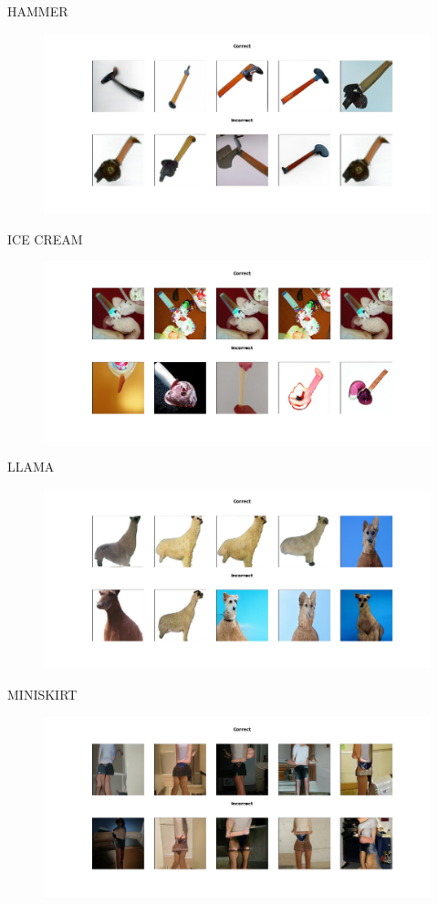 \documentclass[12pt,a4paper,openany]{book}
\begin{document}
\newline
HAMMER
\begin{figure}[ht!]
    \centering
    \includegraphics[scale=0.4]{figs/imagenet_examples/hammer.png}
\end{figure}
\newpage
\noindent ICE CREAM
\begin{figure}[ht!]
    \centering
    \includegraphics[scale=0.4]{figs/imagenet_examples/ice cream.png}
\end{figure}
\newline
LLAMA
\begin{figure}[ht!]
    \centering
    \includegraphics[scale=0.4]{figs/imagenet_examples/llama.png}
\end{figure}
\newpage
\noindent MINISKIRT
\begin{figure}[ht!]
    \centering
    \includegraphics[scale=0.4]{figs/imagenet_examples/miniskirt.png}
\end{figure}
\end{document}
